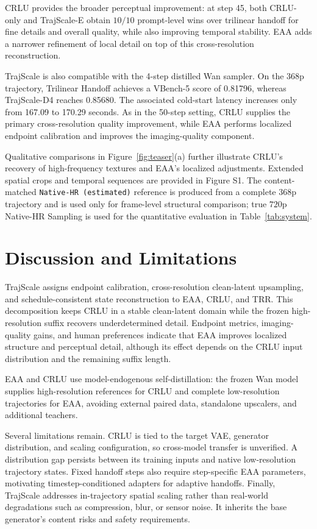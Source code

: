 CRLU provides the broader perceptual improvement: at step 45, both
CRLU-only and TrajScale-E obtain \(10/10\) prompt-level wins over trilinear
handoff for fine details and overall quality, while also improving
temporal stability. EAA adds a narrower refinement of local detail on
top of this cross-resolution reconstruction.

TrajScale is also compatible with the 4-step distilled Wan sampler. On the
\(368\text{p}\) trajectory, Trilinear Handoff achieves a VBench-5 score
of 0.81796, whereas TrajScale-D4 reaches 0.85680. The associated cold-start
latency increases only from 167.09 to 170.29 seconds. As in the 50-step
setting, CRLU supplies the primary cross-resolution quality improvement,
while EAA performs localized endpoint calibration and improves the
imaging-quality component.

Qualitative comparisons in Figure~\ref{fig:teaser}(a) further illustrate
CRLU's recovery of high-frequency textures and EAA's localized
adjustments. Extended spatial crops and temporal sequences are provided
in Figure S1. The content-matched
\texttt{Native-HR (estimated)} reference is produced from a complete
\(368\text{p}\) trajectory and is used only for frame-level structural
comparison; true \(720\text{p}\) Native-HR Sampling is used for the
quantitative evaluation in Table~\ref{tab:system}.

\section{Discussion and Limitations}

TrajScale assigns endpoint calibration, cross-resolution clean-latent
upsampling, and schedule-consistent state reconstruction to EAA, CRLU, and
TRR. This decomposition keeps CRLU in a stable clean-latent domain while the
frozen high-resolution suffix recovers underdetermined detail. Endpoint
metrics, imaging-quality gains, and human preferences indicate that EAA
improves localized structure and perceptual detail, although its effect depends
on the CRLU input distribution and the remaining suffix length.

EAA and CRLU use model-endogenous self-distillation: the frozen Wan model
supplies high-resolution references for CRLU and complete low-resolution
trajectories for EAA, avoiding external paired data, standalone
upscalers, and additional teachers.

Several limitations remain. CRLU is tied to the target VAE, generator
distribution, and scaling configuration, so cross-model transfer is
unverified. A distribution gap persists between its training inputs and
native low-resolution trajectory states. Fixed handoff steps also
require step-specific EAA parameters, motivating timestep-conditioned
adapters for adaptive handoffs. Finally, TrajScale addresses in-trajectory
spatial scaling rather than real-world degradations such as compression,
blur, or sensor noise. It inherits the base generator's content risks
and safety requirements.

